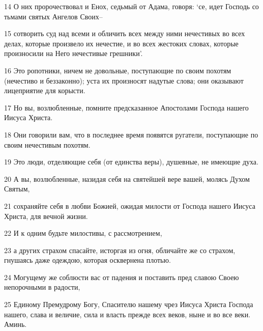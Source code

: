 \par 14 О них пророчествовал и Енох, седьмый от Адама, говоря: `се, идет Господь со тьмами святых Ангелов Своих--
\par 15 сотворить суд над всеми и обличить всех между ними нечестивых во всех делах, которые произвело их нечестие, и во всех жестоких словах, которые произносили на Него нечестивые грешники'.
\par 16 Это ропотники, ничем не довольные, поступающие по своим похотям (нечестиво и беззаконно); уста их произносят надутые слова; они оказывают лицеприятие для корысти.
\par 17 Но вы, возлюбленные, помните предсказанное Апостолами Господа нашего Иисуса Христа.
\par 18 Они говорили вам, что в последнее время появятся ругатели, поступающие по своим нечестивым похотям.
\par 19 Это люди, отделяющие себя (от единства веры), душевные, не имеющие духа.
\par 20 А вы, возлюбленные, назидая себя на святейшей вере вашей, молясь Духом Святым,
\par 21 сохраняйте себя в любви Божией, ожидая милости от Господа нашего Иисуса Христа, для вечной жизни.
\par 22 И к одним будьте милостивы, с рассмотрением,
\par 23 а других страхом спасайте, исторгая из огня, обличайте же со страхом, гнушаясь даже одеждою, которая осквернена плотью.
\par 24 Могущему же соблюсти вас от падения и поставить пред славою Своею непорочными в радости,
\par 25 Единому Премудрому Богу, Спасителю нашему чрез Иисуса Христа Господа нашего, слава и величие, сила и власть прежде всех веков, ныне и во все веки. Аминь.


